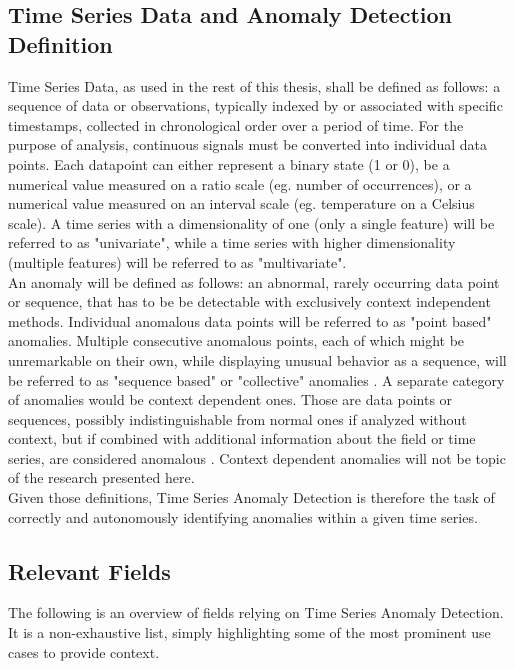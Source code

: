 \documentclass[12pt,oneside]{article}
\begin{document}
\subsection{Time Series Data and Anomaly Detection Definition}
Time Series Data, as used in the rest of this thesis, shall be defined as follows: a sequence of data or observations, typically indexed by or associated with specific timestamps, collected in chronological order over a period of time.
For the purpose of analysis, continuous signals must be converted into individual data points. Each datapoint can either represent a binary state (1 or 0), be a numerical value measured on a ratio scale (eg. number of occurrences), or a numerical value measured on an interval scale (eg. temperature on a Celsius scale).
A time series with a dimensionality of one (only a single feature) will be referred to as "univariate", while a time series with higher dimensionality (multiple features) will be referred to as "multivariate". \\
An anomaly will be defined as follows: an abnormal, rarely occurring data point or sequence, that has to be be detectable with exclusively context independent methods. Individual anomalous data points will be referred to as "point based" anomalies. Multiple consecutive anomalous points, each of which might be unremarkable on their own, while displaying unusual behavior as a sequence,  will be referred to as "sequence based" or "collective" anomalies \parencites[p.~3]{liu2024elephant}[p.~8]{chalapathy2019deeplearninganomalydetection}. A separate category of anomalies would be context dependent ones. Those are data points or sequences, possibly indistinguishable from normal ones if analyzed without context, but if combined with additional information about the field or time series, are considered anomalous \citep[pp.~7-8]{chalapathy2019deeplearninganomalydetection}. Context dependent anomalies will not be topic of the research presented here. \\
Given those definitions, Time Series Anomaly Detection is therefore the task of correctly and autonomously identifying anomalies within a given time series.


\subsection{Relevant Fields}

The following is an overview of fields relying on Time Series Anomaly Detection. It is a non-exhaustive list, simply highlighting some of the most prominent use cases to provide context. \
\end{document}

